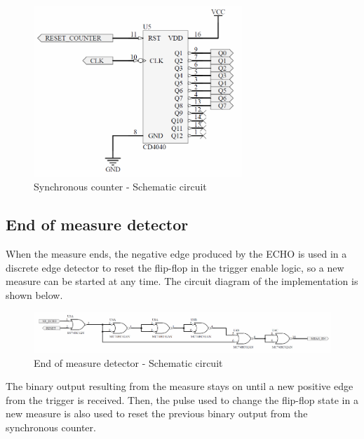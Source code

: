 \begin{figure}[H]
    \begin{centering}
    \includegraphics[width=0.7\textwidth]{Unit_Counter}
    \par\end{centering}
    \caption{Synchronous counter - Schematic circuit}
\end{figure}

\subsection*{End of measure detector}

When the measure ends, the negative edge produced by the ECHO is used in a discrete edge detector 
to reset the flip-flop in the trigger enable logic, so a new measure can be started at any time.
The circuit diagram of the implementation is shown below.

\begin{figure}[H]
    \begin{centering}
    \includegraphics[width=1\textwidth]{Meas_End}
    \par\end{centering}
    \caption{End of measure detector - Schematic circuit}
\end{figure}

The binary output resulting from the measure stays on until a new positive edge from the trigger is 
received. Then, the pulse used to change the flip-flop state in a new measure is also used to reset
the previous binary output from the synchronous counter.

